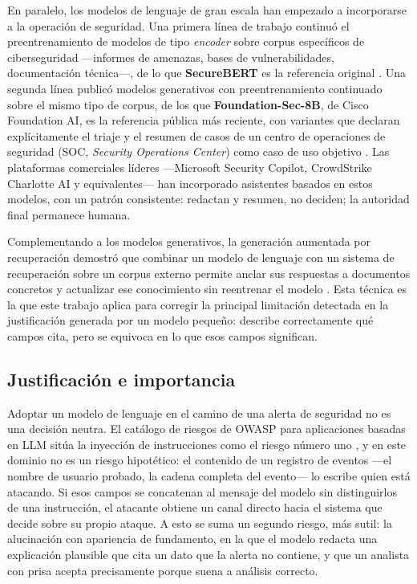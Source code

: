 En paralelo, los modelos de lenguaje de gran escala han empezado a incorporarse a la operación de
seguridad. Una primera línea de trabajo continuó el preentrenamiento de modelos de tipo
\emph{encoder} sobre corpus específicos de ciberseguridad ---informes de amenazas, bases de
vulnerabilidades, documentación técnica---, de lo que \textbf{SecureBERT} es la referencia original
\cite{aghaei2022securebert}. Una segunda línea publicó modelos generativos con preentrenamiento
continuado sobre el mismo tipo de corpus, de los que \textbf{Foundation-Sec-8B}, de Cisco
Foundation AI, es la referencia pública más reciente, con variantes que declaran explícitamente el
triaje y el resumen de casos de un centro de operaciones de seguridad (SOC, \emph{Security
Operations Center}) como caso de uso objetivo \cite{foundationsec8b}. Las plataformas comerciales
líderes ---Microsoft Security Copilot, CrowdStrike Charlotte AI y equivalentes--- han incorporado
asistentes basados en estos modelos, con un patrón consistente: redactan y resumen, no deciden; la
autoridad final permanece humana.

Complementando a los modelos generativos, la generación aumentada por recuperación demostró que
combinar un modelo de lenguaje con un sistema de recuperación sobre un corpus externo permite
anclar sus respuestas a documentos concretos y actualizar ese conocimiento sin reentrenar el modelo
\cite{lewis2020rag}. Esta técnica es la que este trabajo aplica para corregir la principal
limitación detectada en la justificación generada por un modelo pequeño: describe correctamente
qué campos cita, pero se equivoca en lo que esos campos significan.

\subsection*{Justificación e importancia}

Adoptar un modelo de lenguaje en el camino de una alerta de seguridad no es una decisión neutra.
El catálogo de riesgos de OWASP para aplicaciones basadas en LLM sitúa la inyección de instrucciones
como el riesgo número uno \cite{owaspllmtop10}, y en este dominio no es un riesgo hipotético: el
contenido de un registro de eventos ---el nombre de usuario probado, la cadena completa del
evento--- lo escribe quien está atacando. Si esos campos se concatenan al mensaje del modelo sin
distinguirlos de una instrucción, el atacante obtiene un canal directo hacia el sistema que decide
sobre su propio ataque. A esto se suma un segundo riesgo, más sutil: la alucinación con apariencia
de fundamento, en la que el modelo redacta una explicación plausible que cita un dato que la alerta
no contiene, y que un analista con prisa acepta precisamente porque suena a análisis correcto.

